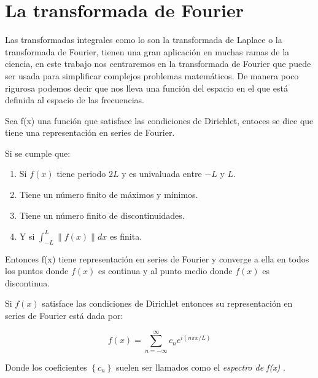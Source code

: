 \section{La transformada de Fourier}
\label{La transformada de Fourier}

Las transformadas integrales como lo son la transformada de Laplace o la transformada de Fourier, tienen una
gran aplicación en muchas ramas de la ciencia, en este trabajo nos centraremos en la transformada de Fourier
que puede ser usada para simplificar complejos problemas matemáticos. De manera poco rigurosa podemos decir
que nos lleva una función del espacio en el que está definida al espacio de las frecuencias.


Sea f(x) una función que satisface las condiciones de Dirichlet, entoces se dice que tiene una
representación en series de Fourier.


\begin{theorem}
  Si se cumple que:
  \begin{enumerate}
    \item Si $f(x)$ tiene periodo $2L$ y es univaluada entre $-L$ y $L$.
    \item Tiene un número finito de máximos y mínimos.
    \item Tiene un número finito de discontinuidades.
    \item Y si $\int_{-L}^{L} \| f(x) \| dx $ es finita.
  \end{enumerate}
  Entonces f(x) tiene representación en series de Fourier y converge a ella en todos los puntos donde
  $f(x)$ es continua y al punto medio donde $f(x)$ es discontinua.
\end{theorem}


\begin{definition}
  Si $f(x)$ satisface las condiciones de Dirichlet entonces su representación en series de Fourier está dada por:

  \begin{equation}
    f(x) = \sum_{n = -\infty}^{\infty} c_{n} e^{i\left( n\pi x / L \right) }
  \end{equation}

\end{definition}


Donde los coeficientes $\left\{ c_{n} \right\}$ suelen ser llamados como el \emph{espectro de f(x)} .


